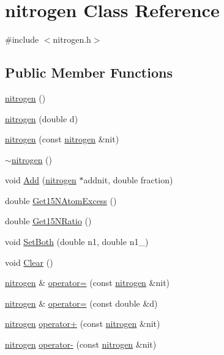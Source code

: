 \hypertarget{classnitrogen}{
\section{nitrogen Class Reference}
\label{classnitrogen}
}


{\ttfamily \#include $<$nitrogen.h$>$}\subsection*{Public Member Functions}
\begin{DoxyCompactItemize}
\item 
\hyperlink{classnitrogen_a9316a74410e242fb4835a9845081ed8a}{nitrogen} ()
\item 
\hyperlink{classnitrogen_a98e9cff6222ee7214e4fb7247b38c83c}{nitrogen} (double d)
\item 
\hyperlink{classnitrogen_ab36e1732c3e534d712a999c79c01f284}{nitrogen} (const \hyperlink{classnitrogen}{nitrogen} \&nit)
\item 
\hyperlink{classnitrogen_aa7a148b2155165270fcafb9d202a0fc0}{$\sim$nitrogen} ()
\item 
void \hyperlink{classnitrogen_af9cc1e0a8e91d9c879bd677f49520151}{Add} (\hyperlink{classnitrogen}{nitrogen} $\ast$addnit, double fraction)
\item 
double \hyperlink{classnitrogen_ae184f15858c998b17d4f62d772615fba}{Get15NAtomExcess} ()
\item 
double \hyperlink{classnitrogen_ac97f3ebad4801a13a7c444bab3b3a886}{Get15NRatio} ()
\item 
void \hyperlink{classnitrogen_a49bebcba4c40f3c0a6abb24f590b2c8c}{SetBoth} (double n1, double n1\_)
\item 
void \hyperlink{classnitrogen_a706b101d934ddb44c4bff07761c8dfef}{Clear} ()
\item 
\hyperlink{classnitrogen}{nitrogen} \& \hyperlink{classnitrogen_a201ffc25ddffd11165eec93a377f85a5}{operator=} (const \hyperlink{classnitrogen}{nitrogen} \&nit)
\item 
\hyperlink{classnitrogen}{nitrogen} \& \hyperlink{classnitrogen_a21c90f538da04099713adf9aac682d7f}{operator=} (const double \&d)
\item 
\hyperlink{classnitrogen}{nitrogen} \hyperlink{classnitrogen_af4923bd19f83ad6b426d6bd4ed06513e}{operator+} (const \hyperlink{classnitrogen}{nitrogen} \&nit)
\item 
\hyperlink{classnitrogen}{nitrogen} \hyperlink{classnitrogen_afe547bcf71290e3ef2cecb268c6745f5}{operator-\/} (const \hyperlink{classnitrogen}{nitrogen} \&nit)

\end{DoxyCompactItemize}
